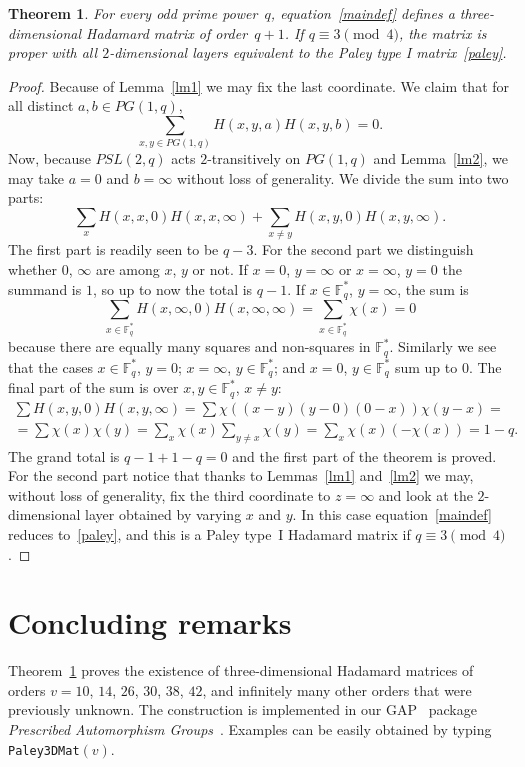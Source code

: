 \documentclass[12pt, reqno]{amsart}
\newtheorem{theorem}{Theorem}[section]
\def\F{\mathbb{F}}
\begin{document}
\begin{theorem}\label{maintm}
For every odd prime power~$q$, equation~\eqref{maindef} defines a three-dimensional Hadamard
matrix of order~$q+1$. If $q\equiv 3 \pmod{4}$, the matrix is proper with all $2$-dimensional
layers equivalent to the Paley type I matrix~\eqref{paley}.
\end{theorem}

\begin{proof}
Because of Lemma~\ref{lm1} we may fix the last coordinate. We claim that
for all distinct $a,b\in PG(1,q)$,
$$\sum_{x,y\in PG(1,q)} H(x,y,a) H(x,y,b)=0.$$
Now, because $PSL(2,q)$ acts $2$-transitively on $PG(1,q)$ and Lemma~\ref{lm2},
we may take $a=0$ and $b=\infty$ without loss of generality. We divide the sum
into two parts:
$$\sum_{x} H(x,x,0)H(x,x,\infty) + \sum_{x\neq y} H(x,y,0)H(x,y,\infty).$$
The first part is readily seen to be $q-3$. For the second part we distinguish whether
$0$, $\infty$ are among $x$, $y$ or not. If $x=0$, $y=\infty$ or $x=\infty$, $y=0$
the summand is $1$, so up to now the total is $q-1$. If $x\in \F_q^*$, $y=\infty$, the
sum is $$\sum_{x\in \F_q^*} H(x,\infty,0)H(x,\infty,\infty)=\sum_{x\in \F_q^*} \chi(x)=0$$
because there are equally many squares and non-squares in $\F_q^*$. Similarly we see that
the cases $x\in \F_q^*$, $y=0$; $x=\infty$, $y \in \F_q^*$; and $x=0$, $y \in \F_q^*$ sum
up to $0$. The final part of the sum is over $x,y\in \F_q^*$, $x\neq y$:
\begin{multline*}
\sum H(x,y,0)H(x,y,\infty)=\sum \chi((x-y)(y-0)(0-x))\chi(y-x)= \\[2mm]
= \sum \chi(x)\chi(y) =\sum_x \chi(x)\sum_{y\neq x}\chi(y) = \sum_x \chi(x)(-\chi(x))=1-q.
\end{multline*}
The grand total is $q-1+1-q=0$ and the first part of the theorem is proved. For the second
part notice that thanks to Lemmas~\ref{lm1} and~\ref{lm2} we may, without loss of generality,
fix the third coordinate to $z=\infty$ and look at the $2$-dimensional layer obtained by
varying $x$ and $y$. In this case equation~\eqref{maindef} reduces to~\eqref{paley}, and
this is a Paley type~I Hadamard matrix if $q\equiv 3 \pmod{4}$.
\end{proof}

\section{Concluding remarks}\label{sec3}

Theorem~\ref{maintm} proves the existence of three-dimensional Hadamard matrices
of orders $v=10$, $14$, $26$, $30$, $38$, $42$, and infinitely many other orders
that were previously unknown. The construction is implemented in our GAP~\cite{GAP4}
package \emph{Prescribed Automorphism Groups}~\cite{PAG}. Examples can be easily
obtained by typing \texttt{Paley3DMat}$(v)$.
\end{document}
